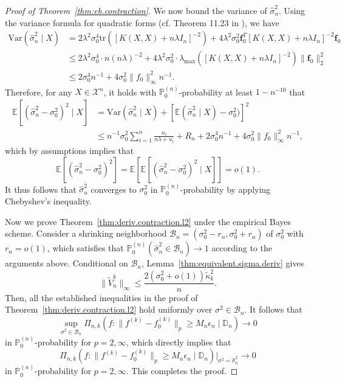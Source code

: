 \documentclass[12pt]{article}
\newcommand{\Var}{\mathrm{Var}}
\newcommand{\tr}{\mathrm{tr}}
\newcommand\data{\mathbb{D}_n}
\newcommand{\EE}{\mathbb{E}}
\newcommand{\PP}{\mathbb{P}}
\newcommand{\mX}{\mathcal{X}}
\theoremstyle{plain}
\theoremstyle{nonitalicremark}
\begin{document}
\begin{appendices}
\begin{proof}[Proof of Theorem~\ref{thm:eb.contraction}]
We now bound the variance of $\hat{\sigma}^2_n$. Using the variance formula for quadratic forms (cf. Theorem 11.23 in \cite{schott2016matrix}), we have
\begin{align}
\Var(\hat{\sigma}^2_n\mid X)&=2\lambda^2\sigma_0^4\tr([K(X,X)+n\lambda I_n]^{-2})+4\lambda^2 \sigma_0^2\bm f^T_0[K(X,X)+n\lambda I_n]^{-2}\bm f_0\\
&\leq 2\lambda^2\sigma_0^4\cdot n(n\lambda)^{-2}+4\lambda^2 \sigma_0^2\cdot \lambda_{\max}([K(X,X)+n\lambda I_n]^{-2})\|\bm f_0\|_2^2\\
&\leq 2\sigma_0^4 n^{-1}+4\sigma_0^2\|f_0\|_\infty^2 n^{-1}.
\end{align}
Therefore, for any $X \in \mX^n$, it holds with $\PP_0^{(n)}$-probability at least $1-n^{-10}$ that
\begin{align}
\EE[(\hat{\sigma}^2_n-\sigma_0^2)^2\mid X] &=\Var(\hat{\sigma}^2_n\mid X)+[\EE(\hat{\sigma}^2_n\mid X)-\sigma_0^2)]^2\\
& \leq  n^{-1} \sigma_0^2 \sum_{i=1}^{n}\frac{u_i}{n\lambda+u_i} + R_n + 2\sigma_0^4 n^{-1}+4\sigma_0^2\|f_0\|_\infty^2 n^{-1},
\end{align}
which by assumptions implies that
\begin{equation}
\EE[(\hat{\sigma}^2_n-\sigma_0^2)^2] = \EE[\EE[(\hat{\sigma}^2_n-\sigma_0^2)^2\mid X]] = o(1).
\end{equation}
It thus follows that $\hat{\sigma}^2_n$ converges to $\sigma_0^2$ in $\PP_0^{(n)}$-probability by applying Chebyshev's inequality.

Now we prove Theorem~\ref{thm:deriv.contraction.l2} under the empirical Bayes scheme. Consider a shrinking neighborhood $\mathcal{B}_n = (\sigma_0^2 - r_n, \sigma_0^2 + r_n)$ of $\sigma_0^2$ with $r_n = o(1)$, which satisfies that $\PP_0^{(n)}(\hat{\sigma}^2_n\in\mathcal{B}_n)\rightarrow 1$ according to the arguments above. Conditional on $\mathcal{B}_n$, Lemma~\ref{thm:equivalent.sigma.deriv} gives
\begin{equation}
\|\tilde{V}^{k}_{n}\|_\infty \leq \frac{2(\sigma_0^2+o(1))\tilde{\kappa}_{k}^2}{n}.
\end{equation}
Then, all the established inequalities in the proof of Theorem~\ref{thm:deriv.contraction.l2} hold uniformly over $\sigma^2\in \mathcal{B}_n$. It follows that
\begin{equation}
\sup_{\sigma^2\in\mathcal{B}_n}\Pi_{n,k}\left(f: \|f^{(k)}-f_0^{(k)}\|_p\geq M_n \epsilon_n \mid \data\right)\rightarrow 0
\end{equation}
in $\PP_0^{(n)}$-probability for $p=2,\infty$, which directly implies that
\begin{equation}
\Pi_{n,k}\left(f: \|f^{(k)}-f_0^{(k)}\|_p\geq M_n \epsilon_n \mid \data\right) \Big |_{\sigma^2 = \hat\sigma^2_n}\rightarrow 0
\end{equation}
in $\PP_0^{(n)}$-probability for $p=2,\infty$. This completes the proof. 
\end{proof}



\end{appendices}
\end{document}

